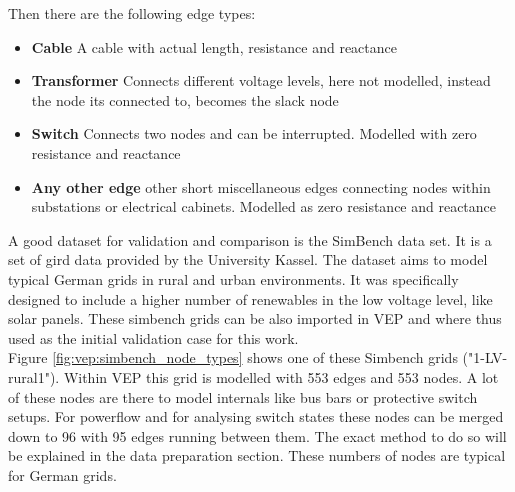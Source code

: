Then there are the following edge types:

\begin{itemize}
    \item \textbf{Cable} A cable with actual length, resistance and reactance
    \item \textbf{Transformer} Connects different voltage levels, here not modelled, instead the node its connected to, becomes the slack node
    \item \textbf{Switch} Connects two nodes and can be interrupted. Modelled with zero resistance and reactance
    \item \textbf{Any other edge} other short miscellaneous edges connecting nodes within substations or electrical cabinets. Modelled as zero resistance and reactance
\end{itemize}

A good dataset for validation and comparison is the SimBench data set. It is a set of
gird data provided by the University Kassel. The dataset aims to model typical German
grids in rural and urban environments. It was specifically designed to include a higher
number of renewables in the low voltage level, like solar panels\autocite{simbench}. These
simbench grids can be also imported in VEP and where thus used as the initial validation case
for this work.\\

Figure \ref{fig:vep:simbench_node_types} shows one of these Simbench grids ("1-LV-rural1"). 
Within VEP this grid is modelled with 553 edges and 553 nodes. A lot of these nodes are there to model
internals like bus bars or protective switch setups. For powerflow and for analysing
switch states these nodes can be merged down to 96 with 95 edges running between them. 
The exact method to do so will be explained in the data preparation section. These numbers of nodes
are typical for German grids\autocite{venios}.

